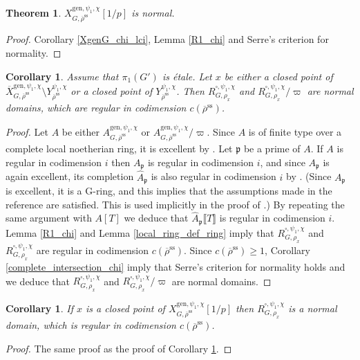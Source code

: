 \documentclass{amsart}
\newtheorem{cor}[prop]{Corollary}
\newtheorem{thm}[prop]{Theorem}
\theoremstyle{definition}
\theoremstyle{remark}
\newcommand{\pp}{\mathfrak p}
\newcommand{\br}[1]{\llbracket #1\rrbracket}
\newcommand{\rhobar}{\overline{\rho}}
\newcommand{\gen}{\mathrm{gen}}
\newcommand{\Xbar}{\overline{X}}
\newcommand{\rhobarss}{\rhobar^{\mathrm{ss}}}
\begin{document}
\begin{thm}\label{gen_fib_normal} $X^{\gen,\psi_1,\chi}_{G,\rhobarss}[1/p]$ is normal.
\end{thm}
\begin{proof} Corollary  \ref{XgenG_chi_lci}, Lemma \ref{R1_chi} and Serre's criterion for normality.
\end{proof}

\begin{cor}\label{reg_codim_x} Assume that $\pi_1(G')$ is \'etale. Let $x$ be either a closed point of $\Xbar^{\gen,\psi_1,\chi}_{G, \rhobarss}\setminus Y_{\rhobarss}^{\psi_1,\chi}$ or  a closed point of $Y^{\psi_1,\chi}_{\rhobarss}$. Then $R^{\square, \psi_1,\chi}_{G, \rho_x}$ and $R^{\square, \psi_1,\chi}_{G, \rho_x}/\varpi$ are normal domains, which are regular in codimension
$c(\rhobarss)$.
\end{cor}
\begin{proof} Let $A$ be either $A^{\gen, \psi_1,\chi}_{G, \rhobarss}$ or $A^{\gen,\psi_1, \chi}_{G, \rhobarss}/\varpi$. Since
$A$ is of finite type over a complete local noetherian ring, it is excellent by \cite[\href{https://stacks.math.columbia.edu/tag/07QW}{Tag 07QW}]{stacks-project}.
Let $\pp$ be a prime of $A$. If $A$ is regular in codimension $i$ then $A_{\pp}$ is regular in codimension $i$, and since $A_{\pp}$ is again excellent, 
its completion $\hat{A}_{\pp}$ is also regular in codimension $i$ by \cite[Theorem 23.9 (ii)]{matsumura}. (Since $A_{\pp}$ is excellent, it is a G-ring, 
and this implies that the assumptions made in the reference are satisfied. This is used implicitly in the proof of \cite[Theorem 32.2 (i)]{matsumura}.)
By repeating the same argument with $A[T]$ we deduce that $\hat{A}_{\pp}\br{T}$ is regular in codimension $i$. Lemma \ref{R1_chi} and 
Lemma \ref{local_ring_def_ring} imply that $R^{\square, \psi_1,\chi}_{G, \rho_x}$ and 
$R^{\square, \psi_1,\chi}_{G, \rho_x}$ are regular in codimension $c(\rhobarss)$.
Since $c(\rhobarss)\ge 1$,  Corollary \ref{complete_intersection_chi} imply that Serre's criterion for normality holds and we deduce that $R^{\square, \psi_1,\chi}_{G, \rho_x}$ and $R^{\square, \psi_1,\chi}_{G, \rho_x}/\varpi$ are normal domains.
\end{proof}

\begin{cor}\label{reg_codim_x_gen} If $x$ is a closed point of $X^{\gen,\psi_1,\chi}_{G, \rhobarss}[1/p]$ then $R^{\square, \psi_1,\chi}_{G, \rho_x}$ is a normal domain, which 
 is regular in codimension $c(\rhobarss)$.
\end{cor}
\begin{proof} The same proof as the proof of Corollary \ref{reg_codim_x}.
\end{proof} 
\end{document}
